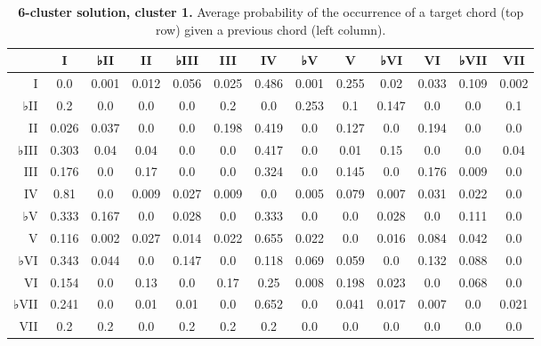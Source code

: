 \begin{table}[htbp]
\begin{minipage}{\linewidth}
\setlength{\tymax}{0.5\linewidth}
\centering
\small
\caption{\textbf{6-cluster solution, cluster 1.} Average probability of the occurrence of a target chord (top row) given a previous chord (left column).}
\label{6-clustersolutioncluster1.averageprobabilityoftheoccurrenceofatargetchordtoprowgivenapreviouschordleftcolumn.}
\begin{tabulary}{\textwidth}{@{}RCCCCCCCCCCCC@{}} \toprule
&I&♭II&II&♭III&III&IV&♭V&V&♭VI&VI&♭VII&VII\\
\midrule
I&0.0&0.001&0.012&0.056&0.025&0.486&0.001&0.255&0.02&0.033&0.109&0.002\\
♭II&0.2&0.0&0.0&0.0&0.2&0.0&0.253&0.1&0.147&0.0&0.0&0.1\\
II&0.026&0.037&0.0&0.0&0.198&0.419&0.0&0.127&0.0&0.194&0.0&0.0\\
♭III&0.303&0.04&0.04&0.0&0.0&0.417&0.0&0.01&0.15&0.0&0.0&0.04\\
III&0.176&0.0&0.17&0.0&0.0&0.324&0.0&0.145&0.0&0.176&0.009&0.0\\
IV&0.81&0.0&0.009&0.027&0.009&0.0&0.005&0.079&0.007&0.031&0.022&0.0\\
♭V&0.333&0.167&0.0&0.028&0.0&0.333&0.0&0.0&0.028&0.0&0.111&0.0\\
V&0.116&0.002&0.027&0.014&0.022&0.655&0.022&0.0&0.016&0.084&0.042&0.0\\
♭VI&0.343&0.044&0.0&0.147&0.0&0.118&0.069&0.059&0.0&0.132&0.088&0.0\\
VI&0.154&0.0&0.13&0.0&0.17&0.25&0.008&0.198&0.023&0.0&0.068&0.0\\
♭VII&0.241&0.0&0.01&0.01&0.0&0.652&0.0&0.041&0.017&0.007&0.0&0.021\\
VII&0.2&0.2&0.0&0.2&0.2&0.2&0.0&0.0&0.0&0.0&0.0&0.0\\

\bottomrule

\end{tabulary}
\end{minipage}
\end{table}

